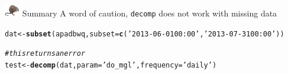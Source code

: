 \documentclass[xcolor=dvipsnames,serif]{beamer}\usepackage[]{graphicx}\usepackage[]{color}
\makeatletter
\newcommand{\hlstr}[1]{\textcolor[rgb]{0.192,0.494,0.8}{#1}}%
\newcommand{\hlcom}[1]{\textcolor[rgb]{0.678,0.584,0.686}{\textit{#1}}}%
\newcommand{\hlstd}[1]{\textcolor[rgb]{0.345,0.345,0.345}{#1}}%
\newcommand{\hlkwb}[1]{\textcolor[rgb]{0.69,0.353,0.396}{#1}}%
\newcommand{\hlkwc}[1]{\textcolor[rgb]{0.333,0.667,0.333}{#1}}%
\newcommand{\hlkwd}[1]{\textcolor[rgb]{0.737,0.353,0.396}{\textbf{#1}}}%
\newenvironment{kframe}{%
 \def\at@end@of@kframe{}%
 \ifinner\ifhmode%
  \def\at@end@of@kframe{\end{minipage}}%
  \begin{minipage}{\columnwidth}%
 \fi\fi%
 \def\FrameCommand##1{\hskip\@totalleftmargin \hskip-\fboxsep
 \colorbox{shadecolor}{##1}\hskip-\fboxsep
     \hskip-\linewidth \hskip-\@totalleftmargin \hskip\columnwidth}%
 \MakeFramed {\advance\hsize-\width
   \@totalleftmargin\z@ \linewidth\hsize
   \@setminipage}}%
 {\par\unskip\endMakeFramed%
 \at@end@of@kframe}
\newenvironment{knitrout}{}{} %
\makeatother
\begin{document}
\begin{frame}[fragile]{\includegraphics[width = 0.05\textwidth]{imgs/swmprat.png} Summary}{}
A word of caution, \texttt{decomp} does not work with missing data
\begin{knitrout}\scriptsize
{}\color{fgcolor}\begin{kframe}
\begin{alltt}
\hlstd{dat} \hlkwb{<-} \hlkwd{subset}\hlstd{(apadbwq,} \hlkwc{subset} \hlstd{=} \hlkwd{c}\hlstd{(}\hlstr{'2013-06-01 00:00'}\hlstd{,} \hlstr{'2013-07-31 00:00'}\hlstd{))}

\hlcom{# this returns an error}
\hlstd{test} \hlkwb{<-} \hlkwd{decomp}\hlstd{(dat,} \hlkwc{param} \hlstd{=} \hlstr{'do_mgl'}\hlstd{,} \hlkwc{frequency} \hlstd{=} \hlstr{'daily'}\hlstd{)}
\end{alltt}


{\ttfamily\noindent\bfseries\color{errorcolor}{\#\# Error in na.omit.ts(x): time series contains internal NAs}}\end{kframe}
\end{knitrout}
\end{frame}
\end{document}
